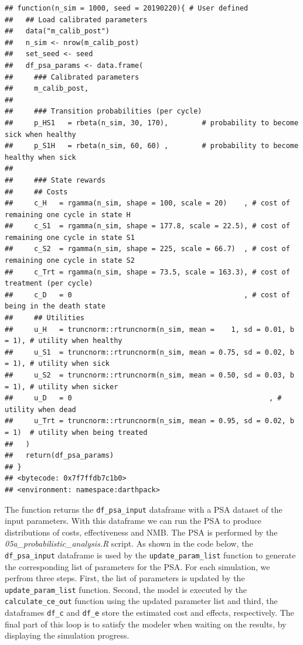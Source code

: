 \documentclass[]{book}
\begin{document}
\begin{verbatim}
## function(n_sim = 1000, seed = 20190220){ # User defined
##   ## Load calibrated parameters
##   data("m_calib_post")
##   n_sim <- nrow(m_calib_post)
##   set_seed <- seed
##   df_psa_params <- data.frame(
##     ### Calibrated parameters
##     m_calib_post,
##     
##     ### Transition probabilities (per cycle)
##     p_HS1   = rbeta(n_sim, 30, 170),        # probability to become sick when healthy
##     p_S1H   = rbeta(n_sim, 60, 60) ,        # probability to become healthy when sick
##     
##     ### State rewards
##     ## Costs
##     c_H   = rgamma(n_sim, shape = 100, scale = 20)    , # cost of remaining one cycle in state H
##     c_S1  = rgamma(n_sim, shape = 177.8, scale = 22.5), # cost of remaining one cycle in state S1
##     c_S2  = rgamma(n_sim, shape = 225, scale = 66.7)  , # cost of remaining one cycle in state S2
##     c_Trt = rgamma(n_sim, shape = 73.5, scale = 163.3), # cost of treatment (per cycle)
##     c_D   = 0                                         , # cost of being in the death state
##     ## Utilities
##     u_H   = truncnorm::rtruncnorm(n_sim, mean =    1, sd = 0.01, b = 1), # utility when healthy
##     u_S1  = truncnorm::rtruncnorm(n_sim, mean = 0.75, sd = 0.02, b = 1), # utility when sick
##     u_S2  = truncnorm::rtruncnorm(n_sim, mean = 0.50, sd = 0.03, b = 1), # utility when sicker
##     u_D   = 0                                               , # utility when dead
##     u_Trt = truncnorm::rtruncnorm(n_sim, mean = 0.95, sd = 0.02, b = 1)  # utility when being treated
##   )
##   return(df_psa_params)
## }
## <bytecode: 0x7f7ffdb7c1b0>
## <environment: namespace:darthpack>
\end{verbatim}

The function returns the \texttt{df\_psa\_input} dataframe with a PSA
dataset of the input parameters. With this dataframe we can run the PSA
to produce distributions of costs, effectiveness and NMB. The PSA is
performed by the \emph{05a\_probabilistic\_analysis.R} script. As shown
in the code below, the \texttt{df\_psa\_input} dataframe is used by the
\texttt{update\_param\_list} function to generate the corresponding list
of parameters for the PSA. For each simulation, we perfrom three steps.
First, the list of parameters is updated by the
\texttt{update\_param\_list} function. Second, the model is executed by
the \texttt{calculate\_ce\_out} function using the updated parameter
list and third, the dataframes \texttt{df\_c} and \texttt{df\_e} store
the estimated cost and effects, respectively. The final part of this
loop is to satisfy the modeler when waiting on the results, by
displaying the simulation progress.
\end{document}
